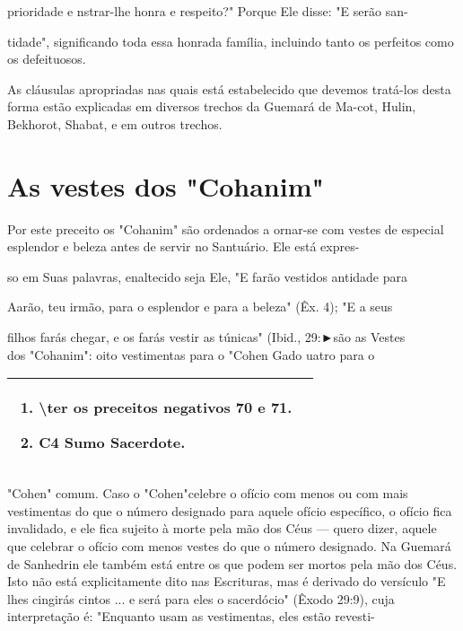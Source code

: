\begin{itemize}
\begin{enumrate}
\begin{itemize}
\begin{itemize}
prioridade e nstrar-lhe honra e respeito?" Porque Ele disse: "E serão
san-

tidade", significando toda essa honrada família, incluindo tanto os
perfeitos co­mo os defeituosos.

As cláusulas apropriadas nas quais está estabelecido que devemos
tratá-los desta forma estão explicadas em diversos trechos da Guemará de
Ma-cot, Hulin, Bekhorot, Shabat, e em outros trechos.


\section{As vestes dos "Cohanim"}


Por este preceito os "Cohanim" são ordenados a ornar-se com ves­tes de
especial esplendor e beleza antes de servir no Santuário. Ele está
expres-

so em Suas palavras, enaltecido seja Ele, "E farão vestidos antidade
para

Aarão, teu irmão, para o esplendor e para a beleza" (Êx. 4); "E a seus

filhos farás chegar, e os farás vestir as túnicas" (Ibid., 29:►são as
Vestes\\
dos "Cohanim": oito vestimentas para o "Cohen Gado uatro para o


\begin{longtable}[]{@{}ll@{}}
\toprule
\endhead
\begin{minipage}[t]{0.47\columnwidth}\raggedright
\begin{enumerate}
\def\labelenumi{\arabic{enumi}.}
\setcounter{enumi}{50}
\item
 
 \textbackslash ter os preceitos negativos 70 e 71.
 
\item
 
 C4 Sumo Sacerdote.
 
\end{enumerate}\strut
\end{minipage} & \begin{minipage}[t]{0.47\columnwidth}\raggedright
\strut
\end{minipage}\tabularnewline
\bottomrule
\end{longtable}




"Cohen" comum. Caso o "Cohen"celebre o ofício com menos ou com mais
vestimentas do que o número designado para aquele ofício específico, o
ofício fica invalidado, e ele fica sujeito à morte pela mão dos Céus ---
quero dizer, aquele que celebrar o ofício com menos vestes do que o
número designado. Na Guemará de Sanhedrin ele também está entre os que
podem ser mortos pela mão dos Céus. Isto não está explicitamente dito
nas Escrituras, mas é derivado do versículo "E lhes cingirás cintos ...
e será para eles o sacerdócio" (Êxodo 29:9), cuja interpretação é:
"Enquanto usam as vestimentas, eles estão revesti-


\end{itemize}
\end{itemize}
\end{enumrate}
\end{itemize}
